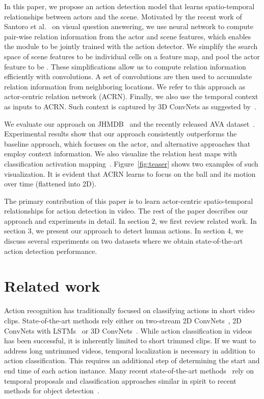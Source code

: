 \documentclass[runningheads]{llncs}
\begin{document}
In this paper, we propose an action detection model that learns spatio-temporal relationships between actors and the scene. Motivated by the recent work of Santoro et al.~\cite{RN_deepmind17} on visual question answering, we use neural network to compute pair-wise relation information from the actor and scene features, which enables the module to be jointly trained with the action detector. We simplify the search space of scene features to be individual cells on a feature map, and pool the actor feature to be . These simplifications allow us to compute relation information efficiently with  convolutions. A set of  convolutions are then used to accumulate relation information from neighboring locations. We refer to this approach as actor-centric relation network (ACRN). Finally, we also use the temporal context as inputs to ACRN. Such context is captured by 3D ConvNets as suggested by~\cite{ava_cvpr18}.

We evaluate our approach on JHMDB~\cite{jhmdb} and the recently released AVA dataset~\cite{ava_cvpr18}. Experimental results show that our approach consistently outperforms the baseline approach, which focuses on the actor, and alternative approaches that employ context information. We also visualize the relation heat maps with classification activation mapping~\cite{zhou2016cvpr_cam}. Figure~\ref{fig:teaser} shows two examples of such visualization. It is evident that ACRN learns to focus on the ball and its motion over time (flattened into 2D).

The primary contribution of this paper is to learn actor-centric spatio-temporal relationships for action detection in video. The rest of the paper describes our approach and experiments in detail. In section 2, we first review related work. In section 3, we present our approach to detect human actions. In section 4, we discuss several experiments on two datasets where we obtain state-of-the-art action detection performance.
 
\section{Related work}


 Action recognition has traditionally focused on classifying actions in short video clips.  State-of-the-art methods rely either on two-stream 2D ConvNets~\cite{Karpathy2014,simonyan2014}, 2D ConvNets with LSTMs~\cite{lrcn2015,ng_cvpr2015} or 3D ConvNets~\cite{i3d_cvpr17,tran2015}.
While action classification in videos has been successful, it is inherently limited to short trimmed clips. If we want to address long untrimmed videos, temporal
localization is necessary in addition to action classification. This requires an additional step of determining the start and end time of each action instance. Many recent state-of-the-art methods~\cite{buch_cvpr17,dai_iccv17,xu_iccv17} rely on  temporal proposals and classification approaches similar in spirit to recent methods for object detection~\cite{ren2015faster}.
\end{document}
